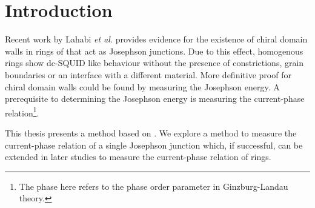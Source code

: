 \chapter{Introduction}
Recent work by Lahabi \textit{et al.} provides evidence for the existence of chiral domain walls in rings of \cite{lahabiSpintripletSupercurrentsOdd2018} that act as Josephson junctions. Due to this effect, homogenous  rings show dc-SQUID like behaviour without the presence of constrictions, grain boundaries or an interface with a different material. More definitive proof for chiral domain walls could be found by measuring the Josephson energy\cite{lahabiSpintripletSupercurrentsOdd2018}. A prerequisite to determining the Josephson energy is measuring the current-phase relation\footnote{The phase here refers to the phase order parameter in Ginzburg-Landau theory.}.

This thesis presents a method based on \citeauthor{frolovMeasurementCurrentPhaseRelation2004} \citeyear{frolovMeasurementCurrentPhaseRelation2004}. We explore a method to measure the current-phase relation of a single Josephson junction which, if successful, can be extended in later studies to measure the current-phase relation of  rings.